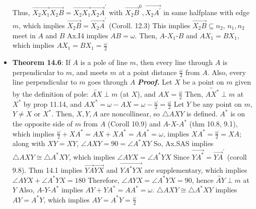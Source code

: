 \documentclass{report}
\begin{document}
\begin{itemize}
            Thus, $\overrightarrow{X_{2}X_{1}}\overrightarrow{X_{2}B} = \overrightarrow{X_{2}X_{1}}\overrightarrow{X_{2}A}^{\prime}$ with $ \overrightarrow{X_{2}B}^{0}, \overrightarrow{X_{2}A^{\prime}}$ in same halfplane with edge $m$, which implies $\overrightarrow{X_{2}B} = \overrightarrow{X_{2}A}^{\prime} $ (Coroll. 12.3)
            \bigbreak \noindent 
            This implies $\overrightarrow{X_{2}B} \subseteq n_{2}$, $n_{1}, n_{2}$ meet in $A$ and $B $
            \bigbreak \noindent 
            Ax.I4 implies $AB = \omega$. Then, $ A\text{-}X_{1}\text{-}B$ and $AX_{1} = BX_{1}$, which implies $ AX_{1} = BX_{1} = \frac{\omega}{2} $ \endpf
        \item \textbf{Theorem 14.6}: If $A$ is a pole of line $m$, then every line through $A$ is perpendicular to $m$, and meets $m$ at a point distance $\frac{\omega}{2} $ from $A$. Also, every line perpendicular to $m$ goes through $A$
            \bigbreak \noindent 
            \textbf{\textit{Proof.}} Let $X$ be a point on $m$ given by the definition of pole: $\overleftrightarrow{AX} \perp m$ (at $X$), and $AX =\frac{\omega}{2}$
            \bigbreak \noindent 
            Then, $\overleftrightarrow{AX^{*}} \perp m$ at $X^{*}$ by prop 11.14, and $AX^{*} = \omega - AX = \omega - \frac{\omega}{2} = \frac{\omega}{2}$
            \bigbreak \noindent 
            Let $Y$ be any point on $m$, $Y \ne X$ or $X^{*}$. Then, $X,Y,A$ are noncollinear, so $\triangle AXY$ is defined.
            \bigbreak \noindent 
            \bigbreak \noindent 
            $A^{*}$ is on the opposite side of $m$ from $A$ (Coroll 10.9) and $ A\text{-}X\text{-}A^{*}$ (thm 10.8, 9.1), which implies $\frac{\omega}{2} + XA^{*} = AX + XA^{*} = AA^{*} = \omega$, implies $XA^{*} = \frac{\omega}{2} = XA$; along with $XY = XY$, $ \angle AXY = 90 = \angle A^{*}XY $
            \bigbreak \noindent 
            So, Ax.SAS implies $\triangle AXY \cong  \triangle A^{*}XY$, which implies $\angle AYX = \angle A^{*}YX $
            \bigbreak \noindent 
            Since $\overrightarrow{YA^{*}}  = \overrightarrow{YA}^{\prime}$ (coroll 9.8).
            \bigbreak \noindent 
            Thm 14.1 implies $\overrightarrow{YA}\overrightarrow{YX}$ and $\overrightarrow{YA^{*}YX} $ are supplementary, which implies $\angle AYX + \angle A^{*}YX = 180 $
            \bigbreak \noindent 
            Therefore, $\angle AYX = \angle A^{*}YX = 90$, hence $\overleftrightarrow{AY} \perp m$ at $Y$
            \bigbreak \noindent 
            Also, $ A\text{-}Y\text{-}A^{*}$ implies $ AY + YA^{*} = AA^{*} = \omega$. $\triangle AXY \cong \triangle A^{*}XY$ implies $AY = A^{*}Y$, which implies $AY = A^{*}Y = \frac{\omega}{2} $

\end{itemize}
\end{document}
